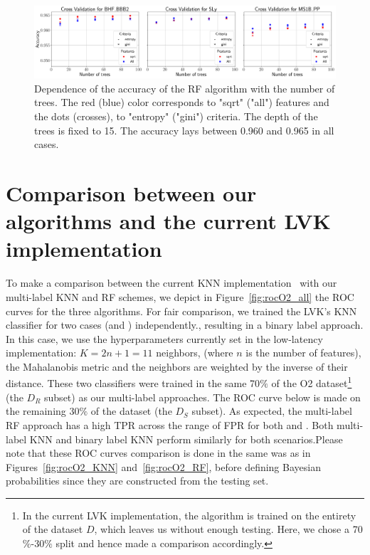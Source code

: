 \begin{figure}%
\includegraphics[width=\linewidth]{cross_val_RF}
\caption{Dependence of the accuracy of the RF algorithm with the number of trees. The red (blue) color corresponds to "sqrt" ("all") features and the dots (crosses), to "entropy" ("gini") criteria.  The depth of the trees is fixed to 15.  The accuracy lays between 0.960 and 0.965 in all cases.}
\label{fig:crossvalRF}
\end{figure}

\section{Comparison between our algorithms and the current LVK implementation}  \label{app:comparison}

To make a comparison between the current \ac{KNN} implementation~\cite{Chatterjee:2019avs} with our multi-label \ac{KNN} and \ac{RF} schemes, we depict in Figure~\ref{fig:rocO2_all} the ROC curves for the three algorithms. For fair comparison,  we trained the LVK's \ac{KNN} classifier for two cases (\hasns and \hasrem) independently., resulting in a binary label approach.  In this case, we use the hyperparameters currently set in the low-latency implementation: $K = 2n + 1 = 11$ neighbors, (where $n$ is the number of features), the Mahalanobis metric and the neighbors are weighted by the inverse of their distance.  These two classifiers were trained in the same 70$\%$ of the O2 dataset\footnote{In the current LVK implementation, the algorithm is trained on the entirety of the dataset $D$, which leaves us without enough testing. Here, we chose a 70$\%$-30$\%$ split and hence made a comparison accordingly. } (the $D_R$ subset) as our multi-label approaches. The ROC curve below is made on the remaining 30$\%$ of the dataset (the $D_S$ subset). As expected,  the multi-label RF approach has a high TPR across the range of FPR for both \hasns and \hasrem . Both multi-label KNN and binary label KNN perform similarly for both scenarios.Please note that these ROC curves comparison is done in the same was as in Figures~\ref{fig:rocO2_KNN} and~\ref{fig:rocO2_RF}, before defining Bayesian probabilities since they are constructed from the testing set. 

